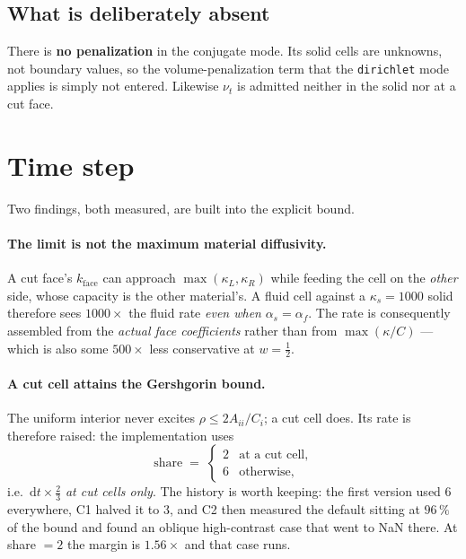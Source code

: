 \documentclass[11pt,a4paper]{article}
\newcommand{\code}[1]{\texttt{#1}}
\begin{document}
\subsection{What is deliberately absent}
There is \textbf{no penalization} in the conjugate mode. Its solid cells are
unknowns, not boundary values, so the volume-penalization term that the
\code{dirichlet} mode applies is simply not entered. Likewise $\nu_t$ is
admitted neither in the solid nor at a cut face.

\section{Time step}

Two findings, both measured, are built into the explicit bound.

\paragraph{The limit is not the maximum material diffusivity.}
A cut face's $k_{\text{face}}$ can approach $\max(\kappa_L,\kappa_R)$ while
feeding the cell on the \emph{other} side, whose capacity is the other
material's. A fluid cell against a $\kappa_s=1000$ solid therefore sees $1000
\times$ the fluid rate \emph{even when} $\alpha_s=\alpha_f$. The rate is
consequently assembled from the \emph{actual face coefficients} rather than
from $\max(\kappa/C)$ --- which is also some $500\times$ less conservative at
$w=\tfrac12$.

\paragraph{A cut cell attains the Gershgorin bound.}
The uniform interior never excites $\rho \le 2A_{ii}/C_i$; a cut cell does. Its
rate is therefore raised: the implementation uses
\[
  \text{share} \;=\;
  \begin{cases}
    2 & \text{at a cut cell},\\
    6 & \text{otherwise},
  \end{cases}
\]
i.e.\ $\mathrm{d}t \times \tfrac23$ \emph{at cut cells only}. The history is
worth keeping: the first version used $6$ everywhere, C1 halved it to $3$, and
C2 then measured the default sitting at $96\,\%$ of the bound and found an
oblique high-contrast case that went to NaN there. At share $=2$ the margin is
$1.56\times$ and that case runs.
\end{document}
